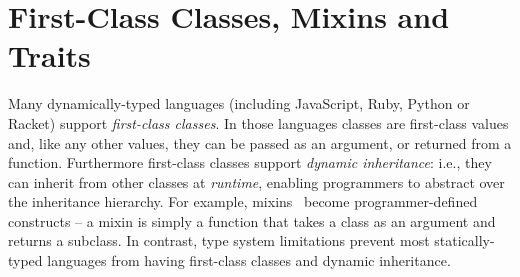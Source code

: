 

\section{First-Class Classes, Mixins and Traits}

Many dynamically-typed languages (including JavaScript, Ruby, Python or Racket)
support \emph{first-class classes}. In those languages classes are first-class
values and, like any other values, they can be passed as an argument, or
returned from a function. Furthermore first-class classes support \emph{dynamic
  inheritance}: i.e., they can inherit from other classes at \emph{runtime},
enabling programmers to abstract over the inheritance hierarchy. For example,
mixins~\citep{bracha1990mixin} become programmer-defined constructs -- a mixin is
simply a function that takes a class as an argument and returns a subclass. In
contrast, type system limitations prevent most statically-typed languages from
having first-class classes and dynamic inheritance.

